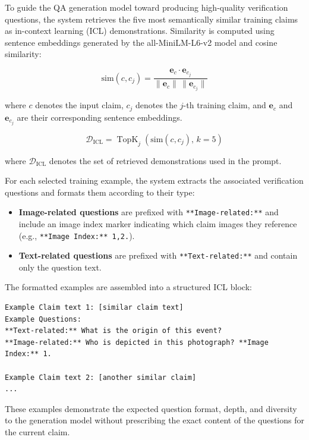 To guide the QA generation model toward producing high-quality verification questions, the system retrieves the five most semantically similar training claims as in-context learning (ICL) demonstrations. Similarity is computed using sentence embeddings generated by the all-MiniLM-L6-v2 model and cosine similarity:

\begin{equation}
\text{sim}(c,c_j)
=
\frac{\mathbf{e}_c \cdot \mathbf{e}_{c_j}}
{\|\mathbf{e}_c\| \, \|\mathbf{e}_{c_j}\|}
\label{eq:icl_cosine_similarity}
\end{equation}

where $c$ denotes the input claim, $c_j$ denotes the $j$-th training claim, and $\mathbf{e}_c$ and $\mathbf{e}_{c_j}$ are their corresponding sentence embeddings.

\begin{equation}
\mathcal{D}_{\text{ICL}}
=
\operatorname{TopK}_{j}
\left(
\text{sim}(c,c_j),\, k=5
\right)
\label{eq:icl_topk}
\end{equation}

where $\mathcal{D}_{\text{ICL}}$ denotes the set of retrieved demonstrations used in the prompt.

For each selected training example, the system extracts the associated verification questions and formats them according to their type:

\begin{itemize}
    \item \textbf{Image-related questions} are prefixed with \texttt{**Image-related:**} and include an image index marker indicating which claim images they reference (e.g., \texttt{**Image Index:** 1,2.}).
    \item \textbf{Text-related questions} are prefixed with \texttt{**Text-related:**} and contain only the question text.
\end{itemize}

The formatted examples are assembled into a structured ICL block:

\begin{verbatim}
Example Claim text 1: [similar claim text]
Example Questions:
**Text-related:** What is the origin of this event?
**Image-related:** Who is depicted in this photograph? **Image Index:** 1.

Example Claim text 2: [another similar claim]
...
\end{verbatim}

These examples demonstrate the expected question format, depth, and diversity to the generation model without prescribing the exact content of the questions for the current claim.


